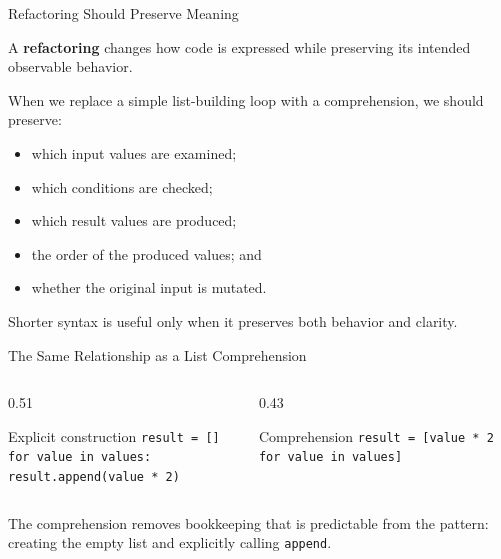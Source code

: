 \documentclass[aspectratio=169,10pt]{beamer}
\begin{document}
\begin{frame}{Refactoring Should Preserve Meaning}
  \begin{cpdefinition}
    A \textbf{refactoring} changes how code is expressed while preserving its intended observable behavior.
  \end{cpdefinition}

  When we replace a simple list-building loop with a comprehension, we should preserve:

  \begin{itemize}
    \item which input values are examined;
    \item which conditions are checked;
    \item which result values are produced;
    \item the order of the produced values; and
    \item whether the original input is mutated.
  \end{itemize}

  \begin{keyidea}
    Shorter syntax is useful only when it preserves both behavior and clarity.
  \end{keyidea}
\end{frame}


\begin{frame}{The Same Relationship as a List Comprehension}
  \begin{columns}[T,onlytextwidth]
    \begin{column}{0.51\textwidth}
      \begin{block}{Explicit construction}
        \texttt{result = []}\\
        \texttt{for value in values:}\\
        \hspace{0.18in}\texttt{result.append(value * 2)}
      \end{block}
    \end{column}
    \begin{column}{0.43\textwidth}
      \begin{block}{Comprehension}
        \texttt{result = [value * 2}\\
        \hspace{0.45in}\texttt{for value in values]}
      \end{block}
    \end{column}
  \end{columns}

  \begin{keyidea}
    The comprehension removes bookkeeping that is predictable from the pattern: creating the empty list and explicitly calling \texttt{append}.
  \end{keyidea}
\end{frame}
\end{document}
